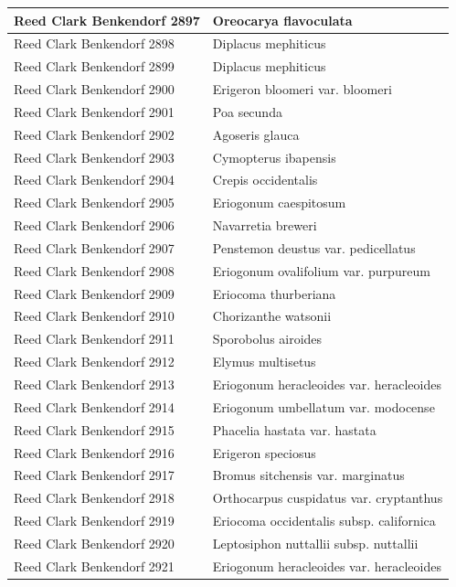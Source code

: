 \documentclass[
]{article}
\begin{document}
\begin{longtable}{l|l}
\hline
Reed Clark Benkendorf 2897 & Oreocarya flavoculata\\
\hline
Reed Clark Benkendorf 2898 & Diplacus mephiticus\\
\hline
Reed Clark Benkendorf 2899 & Diplacus mephiticus\\
\hline
Reed Clark Benkendorf 2900 & Erigeron bloomeri var. bloomeri\\
\hline
Reed Clark Benkendorf 2901 & Poa secunda\\
\hline
Reed Clark Benkendorf 2902 & Agoseris glauca\\
\hline
Reed Clark Benkendorf 2903 & Cymopterus ibapensis\\
\hline
Reed Clark Benkendorf 2904 & Crepis occidentalis\\
\hline
Reed Clark Benkendorf 2905 & Eriogonum caespitosum\\
\hline
Reed Clark Benkendorf 2906 & Navarretia breweri\\
\hline
Reed Clark Benkendorf 2907 & Penstemon deustus var. pedicellatus\\
\hline
Reed Clark Benkendorf 2908 & Eriogonum ovalifolium var. purpureum\\
\hline
Reed Clark Benkendorf 2909 & Eriocoma thurberiana\\
\hline
Reed Clark Benkendorf 2910 & Chorizanthe watsonii\\
\hline
Reed Clark Benkendorf 2911 & Sporobolus airoides\\
\hline
Reed Clark Benkendorf 2912 & Elymus multisetus\\
\hline
Reed Clark Benkendorf 2913 & Eriogonum heracleoides var.  heracleoides\\
\hline
Reed Clark Benkendorf 2914 & Eriogonum umbellatum var.  modocense\\
\hline
Reed Clark Benkendorf 2915 & Phacelia hastata var.  hastata\\
\hline
Reed Clark Benkendorf 2916 & Erigeron speciosus\\
\hline
Reed Clark Benkendorf 2917 & Bromus sitchensis var. marginatus\\
\hline
Reed Clark Benkendorf 2918 & Orthocarpus cuspidatus var. cryptanthus\\
\hline
Reed Clark Benkendorf 2919 & Eriocoma occidentalis subsp.  californica\\
\hline
Reed Clark Benkendorf 2920 & Leptosiphon nuttallii subsp. nuttallii\\
\hline
Reed Clark Benkendorf 2921 & Eriogonum heracleoides var. heracleoides\\

\end{longtable}
\end{document}
